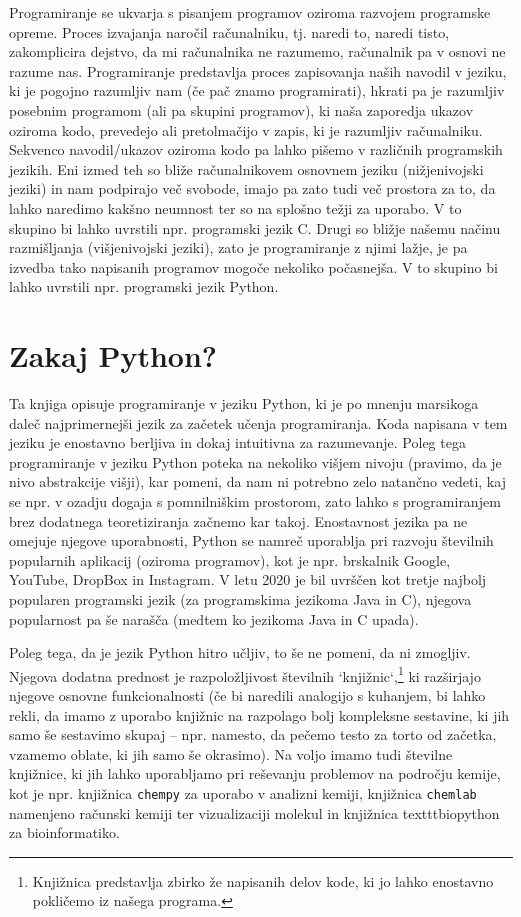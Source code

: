 Programiranje se ukvarja s pisanjem programov oziroma razvojem programske opreme. Proces izvajanja naročil računalniku, tj. naredi to, naredi tisto, zakomplicira dejstvo, da mi računalnika ne razumemo, računalnik pa v osnovi ne razume nas. Programiranje predstavlja proces zapisovanja naših navodil v jeziku, ki je pogojno razumljiv nam (če pač znamo programirati), hkrati pa je razumljiv posebnim programom (ali pa skupini programov), ki naša zaporedja ukazov oziroma kodo, prevedejo  ali pretolmačijo  v zapis, ki je razumljiv računalniku. 
Sekvenco navodil/ukazov oziroma kodo pa lahko pišemo v različnih programskih jezikih. Eni izmed teh so bliže računalnikovem osnovnem jeziku (nižjenivojski jeziki) in nam podpirajo več svobode, imajo pa zato tudi več prostora za to, da lahko naredimo kakšno neumnost ter so na splošno težji za uporabo. V to skupino bi lahko uvrstili npr. programski jezik C. Drugi so bližje našemu načinu razmišljanja (višjenivojski jeziki), zato je programiranje z njimi lažje, je pa izvedba tako napisanih programov mogoče nekoliko počasnejša. V to skupino bi lahko uvrstili npr. programski jezik Python.

\section{Zakaj Python?}

Ta knjiga opisuje programiranje v jeziku Python, ki je po mnenju marsikoga daleč najprimernejši jezik za začetek učenja programiranja. Koda napisana v tem jeziku je enostavno berljiva in dokaj intuitivna za razumevanje. Poleg tega programiranje v jeziku Python poteka na nekoliko višjem nivoju (pravimo, da je nivo abstrakcije višji), kar pomeni, da nam ni potrebno zelo natančno vedeti, kaj se npr. v ozadju dogaja s pomnilniškim prostorom, zato lahko s programiranjem brez dodatnega teoretiziranja začnemo kar takoj. Enostavnost jezika pa ne omejuje njegove uporabnosti, Python se namreč uporablja pri razvoju številnih popularnih aplikacij (oziroma programov), kot je npr. brskalnik Google, YouTube, DropBox in Instagram. V letu 2020 je bil uvrščen kot tretje najbolj popularen programski jezik (za programskima jezikoma Java in C), njegova popularnost pa še narašča (medtem ko jezikoma Java in C upada). 

Poleg tega, da je jezik Python hitro učljiv, to še ne pomeni, da ni zmogljiv. Njegova dodatna prednost je razpoložljivost številnih `knjižnic`,\footnote{Knjižnica predstavlja zbirko že napisanih delov kode, ki jo lahko enostavno pokličemo iz našega programa.} ki razširjajo njegove osnovne funkcionalnosti (če bi naredili analogijo s kuhanjem, bi lahko rekli, da imamo z uporabo knjižnic na razpolago bolj kompleksne sestavine, ki jih samo še sestavimo skupaj -- npr. namesto, da pečemo testo za torto od začetka, vzamemo oblate, ki jih samo še okrasimo). Na voljo imamo tudi številne knjižnice, ki jih lahko uporabljamo pri reševanju problemov na področju kemije, kot je npr. knjižnica \texttt{chempy} za uporabo v analizni kemiji, knjižnica \texttt{chemlab} namenjeno računski kemiji ter vizualizaciji molekul in knjižnica texttt{biopython} za bioinformatiko.

